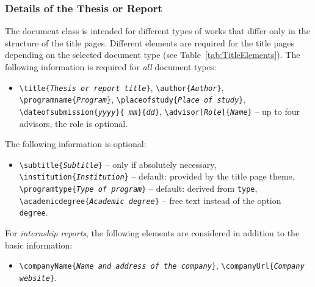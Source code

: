 \subsubsection{Details of the Thesis or Report}

The document class is intended for different types of works that differ only in
the structure of the title pages. Different elements are required for the title
pages depending on the selected document type (see
Table~\ref{tab:TitleElements}). The following information is required for
\emph{all} document types:
%
\begin{itemize}
    \item[] %
    \verb!\title{!\texttt{\em Thesis or report title}\verb!}!, \newline%
    \verb!\author{!\texttt{\em Author}\verb!}!, \newline%
    \verb!\programname{!\texttt{\em Program}\verb!}!, \newline%
    \verb!\placeofstudy{!\texttt{\em Place of study}\verb!}!, \newline%
    \verb!\dateofsubmission{!\texttt{\em yyyy}\verb!}{!\texttt{\em
    mm}\verb!}{!\texttt{\em dd}\verb!}!, \newline%
    \verb!\advisor[!\texttt{\em Role}\verb!]{!\texttt{\em Name}\verb!}! --
    up to four advisors, the role is optional.
\end{itemize}
%
\noindent
The following information is optional:
%
\begin{itemize}
    \item[] %
    \verb!\subtitle{!\texttt{\em Subtitle}\verb!}! --
    only if absolutely necessary, \newline%
    \verb!\institution{!\texttt{\em Institution}\verb!}! --
    default: provided by the title page theme, \newline%
    \verb!\programtype{!\texttt{\em Type of program}\verb!}! --
    default: derived from \texttt{type}, \newline%
    \verb!\academicdegree{!\texttt{\em Academic degree}\verb!}! --
    free text instead of the option \texttt{degree}.
\end{itemize}
%
\noindent
For \emph{internship reports}, the following elements are considered in
addition to the basic information:
%
\begin{itemize}
    \item[] %
    \verb!\companyName{!\texttt{\em Name and address of the company}\verb!}!,
    \newline%
    \verb!\companyUrl{!\texttt{\em Company website}\verb!}!.
\end{itemize}

